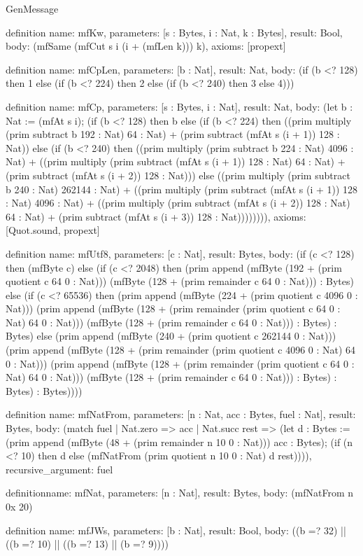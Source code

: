 \begin{lexlean}{GenMessage}
\begin{semanticmodule}
definition{
  name: mfKw,
  parameters: [s : Bytes, i : Nat, k : Bytes],
  result: Bool,
  body: (mfSame (mfCut s i (i + (mfLen k))) k),
  axioms: [propext]
}

definition{
  name: mfCpLen,
  parameters: [b : Nat],
  result: Nat,
  body: (if (b <? 128) then 1 else (if (b <? 224) then 2 else (if (b <? 240) then 3 else 4)))
}

definition{
  name: mfCp,
  parameters: [s : Bytes, i : Nat],
  result: Nat,
  body: (let b : Nat := (mfAt s i); (if (b <? 128) then b else (if (b <? 224) then ((prim multiply (prim subtract b 192 : Nat) 64 : Nat) + (prim subtract (mfAt s (i + 1)) 128 : Nat)) else (if (b <? 240) then ((prim multiply (prim subtract b 224 : Nat) 4096 : Nat) + ((prim multiply (prim subtract (mfAt s (i + 1)) 128 : Nat) 64 : Nat) + (prim subtract (mfAt s (i + 2)) 128 : Nat))) else ((prim multiply (prim subtract b 240 : Nat) 262144 : Nat) + ((prim multiply (prim subtract (mfAt s (i + 1)) 128 : Nat) 4096 : Nat) + ((prim multiply (prim subtract (mfAt s (i + 2)) 128 : Nat) 64 : Nat) + (prim subtract (mfAt s (i + 3)) 128 : Nat)))))))),
  axioms: [Quot.sound, propext]
}

definition{
  name: mfUtf8,
  parameters: [c : Nat],
  result: Bytes,
  body: (if (c <? 128) then (mfByte c) else (if (c <? 2048) then (prim append (mfByte (192 + (prim quotient c 64 0 : Nat))) (mfByte (128 + (prim remainder c 64 0 : Nat))) : Bytes) else (if (c <? 65536) then (prim append (mfByte (224 + (prim quotient c 4096 0 : Nat))) (prim append (mfByte (128 + (prim remainder (prim quotient c 64 0 : Nat) 64 0 : Nat))) (mfByte (128 + (prim remainder c 64 0 : Nat))) : Bytes) : Bytes) else (prim append (mfByte (240 + (prim quotient c 262144 0 : Nat))) (prim append (mfByte (128 + (prim remainder (prim quotient c 4096 0 : Nat) 64 0 : Nat))) (prim append (mfByte (128 + (prim remainder (prim quotient c 64 0 : Nat) 64 0 : Nat))) (mfByte (128 + (prim remainder c 64 0 : Nat))) : Bytes) : Bytes) : Bytes))))
}

definition{
  name: mfNatFrom,
  parameters: [n : Nat, acc : Bytes, fuel : Nat],
  result: Bytes,
  body: (match fuel
    | Nat.zero => acc
    | Nat.succ rest => (let d : Bytes := (prim append (mfByte (48 + (prim remainder n 10 0 : Nat))) acc : Bytes); (if (n <? 10) then d else (mfNatFrom (prim quotient n 10 0 : Nat) d rest)))),
  recursive_argument: fuel
}

definition{name: mfNat, parameters: [n : Nat], result: Bytes, body: (mfNatFrom n 0x 20)}

definition{
  name: mfJWs,
  parameters: [b : Nat],
  result: Bool,
  body: ((b =? 32) || ((b =? 10) || ((b =? 13) || (b =? 9))))
}


\end{semanticmodule}
\end{lexlean}
